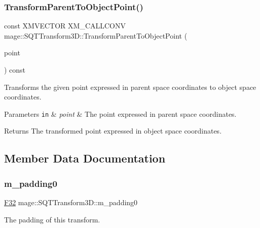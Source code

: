 \subsubsection{\texorpdfstring{Transform\+Parent\+To\+Object\+Point()}{TransformParentToObjectPoint()}}
{\footnotesize\ttfamily const X\+M\+V\+E\+C\+T\+OR X\+M\+\_\+\+C\+A\+L\+L\+C\+O\+NV mage\+::\+S\+Q\+T\+Transform3\+D\+::\+Transform\+Parent\+To\+Object\+Point (\begin{DoxyParamCaption}\item[{F\+X\+M\+V\+E\+C\+T\+OR}]{point }\end{DoxyParamCaption}) const\hspace{0.3cm}{\ttfamily [noexcept]}}

Transforms the given point expressed in parent space coordinates to object space coordinates.


\begin{DoxyParams}[1]{Parameters}
\mbox{\tt in}  & {\em point} & The point expressed in parent space coordinates. \\
\hline
\end{DoxyParams}
\begin{DoxyReturn}{Returns}
The transformed point expressed in object space coordinates. 
\end{DoxyReturn}


\subsection{Member Data Documentation}
\mbox{\label{classmage_1_1_s_q_t_transform3_d_a12fd544ab7fe5e30fee85948bd3e6eac}} 
\subsubsection{\texorpdfstring{m\+\_\+padding0}{m\_padding0}}
{\footnotesize\ttfamily \mbox{\hyperlink{namespacemage_aa97e833b45f06d60a0a9c4fc22ae02c0}{F32}} mage\+::\+S\+Q\+T\+Transform3\+D\+::m\+\_\+padding0\hspace{0.3cm}{\ttfamily [private]}}

The padding of this transform. \mbox{\label{classmage_1_1_s_q_t_transform3_d_ac0a31b128eec13e9d4e40fae371e3f83}} 
